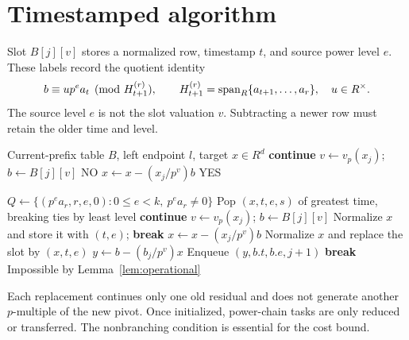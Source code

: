 \documentclass[11pt,a4paper]{article}
\theoremstyle{definition}
\theoremstyle{plain}
\begin{document}
\section{Timestamped algorithm}
Slot $B[j][v]$ stores a normalized row, timestamp $t$, and source power level $e$. These labels
record the quotient identity
\begin{equation}\label{eq:identity}
 b\equiv u p^e a_t\pmod{H_{t+1}^{(r)}},\qquad
 H_{t+1}^{(r)}=\operatorname{span}_R\{a_{t+1},\ldots,a_r\},\quad u\in R^\times.
\end{equation}
The source level $e$ is not the slot valuation $v$. Subtracting a newer row must retain the older
time and level.

\begin{algorithm}[htbp]
\small
\caption{Query suffix $[l,r]$ of the current prefix}\label{alg:query}
\begin{algorithmic}[1]
\Require Current-prefix table $B$, left endpoint $l$, target $x\in R^d$
   \State \textbf{continue} \EndIf
  \State $v\gets v_p(x_j)$; $b\gets B[j][v]$
   \State \Return NO \EndIf
  \State $x\gets x-(x_j/p^v)b$ 
\EndFor
\State \Return YES
\end{algorithmic}
\end{algorithm}

\begin{algorithm}[htbp]
\small
\caption{Append vector $a_r$ at time $r$}\label{alg:append}
\begin{algorithmic}[1]
\State $Q\gets\{(p^e a_r,r,e,0):0\le e<k,\ p^e a_r\ne0\}$
  \State Pop $(x,t,e,s)$ of greatest time, breaking ties by least level
     \State \textbf{continue} \EndIf
    \State $v\gets v_p(x_j)$; $b\gets B[j][v]$
      \State Normalize $x$ and store it with $(t,e)$; \textbf{break}
      \State $x\gets x-(x_j/p^v)b$
      \State Normalize $x$ and replace the slot by $(x,t,e)$
      \State $y\gets b-(b_j/p^v)x$
       \State Enqueue $(y,b.t,b.e,j+1)$ \EndIf
      \State \textbf{break}
    \Else
      \State Impossible by Lemma~\ref{lem:operational}
    \EndIf
  \EndFor
\EndWhile
\end{algorithmic}
\end{algorithm}

Each replacement continues only one old residual and does not generate another $p$-multiple of
the new pivot. Once initialized, power-chain tasks are only reduced or transferred. The
nonbranching condition is essential for the cost bound.
\end{document}
